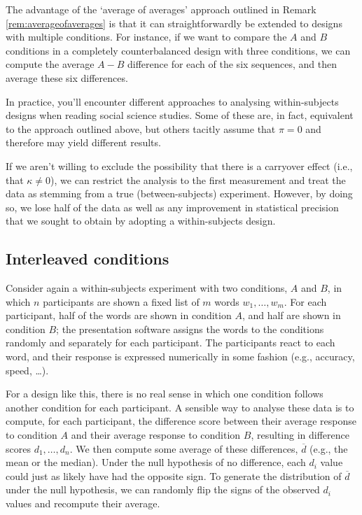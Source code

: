   The advantage of the `average of averages' approach outlined in
  Remark \ref{rem:averageofaverages} is that it can straightforwardly
  be extended to designs with multiple conditions.
  For instance, if we want to compare the $A$ and $B$ conditions in a
  completely counterbalanced design with three conditions,
  we can compute the average $A - B$ difference for each of the six
  sequences, and then average these six differences.
\parend

In practice, you'll encounter different approaches to analysing within-subjects 
designs when reading social science studies.
Some of these are, in fact, equivalent to the approach outlined above,
but others tacitly assume that $\pi = 0$ and therefore may yield different
results.
\parend

  If we aren't willing to exclude the possibility that there is 
  a carryover effect (i.e., that $\kappa \neq 0$),
  we can restrict the analysis to the first measurement
  and treat the data as stemming from a true (between-subjects) experiment.
  However, by doing so, we lose half of the data as well as
  any improvement in statistical precision that we sought to obtain
  by adopting a within-subjects design.
\parend

\subsection{Interleaved conditions}
Consider again a within-subjects experiment with two conditions, $A$ and $B$,
in which $n$ participants are shown a fixed list of $m$ words $w_1, \dots, w_m$.
For each participant, half of the words are shown in condition $A$,
and half are shown in condition $B$;
the presentation software assigns the words to the conditions randomly
and separately for each participant.
The participants react to each word, and their response is expressed numerically
in some fashion (e.g., accuracy, speed, \dots).

For a design like this, there is no real sense in which one condition
follows another condition for each participant.
A sensible way to analyse these data is to compute, for each participant,
the difference score between their average response to condition $A$
and their average response to condition $B$, resulting in difference
scores $d_1, \dots, d_n$.
We then compute some average of these differences, $\overline d$
(e.g., the mean or the median).
Under the null hypothesis of no difference,
each $d_i$ value could just as likely have had the opposite sign.
To generate the distribution of $\overline d$ under the null hypothesis,
we can randomly flip the signs of the observed $d_i$ values
and recompute their average.

